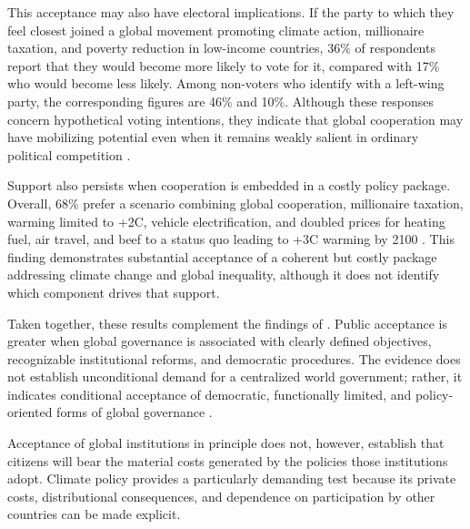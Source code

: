 \documentclass[11pt,a4paper]{article}
\begin{document}
This acceptance may also have electoral implications. If the party to which they feel closest joined a global movement promoting climate action, millionaire taxation, and poverty reduction in low-income countries, 36\% of respondents report that they would become more likely to vote for it, compared with 17\% who would become less likely. Among non-voters who identify with a left-wing party, the corresponding figures are 46\% and 10\%. Although these responses concern hypothetical voting intentions, they indicate that global cooperation may have mobilizing potential even when it remains weakly salient in ordinary political competition \citep{fabre_public_2026}.

Support also persists when cooperation is embedded in a costly policy package. Overall, 68\% prefer a scenario combining global cooperation, millionaire taxation, warming limited to +2\textdegree{}C, vehicle electrification, and doubled prices for heating fuel, air travel, and beef to a status quo leading to +3\textdegree{}C warming by 2100 \citep{fabre_public_2026}. This finding demonstrates substantial acceptance of a coherent but costly package addressing climate change and global inequality, although it does not identify which component drives that support.

Taken together, these results complement the findings of \citet{ghassim_who_2024}. Public acceptance is greater when global governance is associated with clearly defined objectives, recognizable institutional reforms, and democratic procedures. The evidence does not establish unconditional demand for a centralized world government; rather, it indicates conditional acceptance of democratic, functionally limited, and policy-oriented forms of global governance \citep{fabre_public_2026,ghassim_who_2024}.

Acceptance of global institutions in principle does not, however, establish that citizens will bear the material costs generated by the policies those institutions adopt. Climate policy provides a particularly demanding test because its private costs, distributional consequences, and dependence on participation by other countries can be made explicit.
\end{document}
